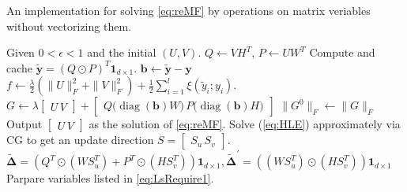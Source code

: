 \documentclass[11pt,twoside]{article}
\newcommand{\bsym}[1]{\ensuremath{\boldsymbol{#1}}}
\newcommand{\bb}{\ensuremath{\bsym{b}}}
\newcommand{\by}{\ensuremath{\bsym{y}}}
\newcommand{\byy}{\ensuremath{\bsym{\tilde{y}}}}
\newcommand{\pointprod}[2]{\ensuremath{\left( #1 \operatorname{\prescript{}{\cdot}{\ast}} #2 \right)}}
\DeclareMathOperator*{\diag}{diag}
\begin{document}
\clearpage\newpage
\begin{algorithm}
    \caption{An implementation for solving \eqref{eq:reMF} by operations on matrix veriables without vectorizing them.}
    \label{alg:LrFramework}
    \begin{algorithmic}[1]
        \State Given $0< \epsilon < 1$ and the initial $(U,V)$.
        \State $Q \gets VH^T$, $P \gets UW^T$
        \State Compute and cache $\bsym{\tilde{y}}= (Q \odot P)^T\bsym{1}_{d\times 1}$.
        \State $\bb \leftarrow \byy - \by $
        \State $f \gets \frac{\lambda}{2}(\|U\|_F^2 + \|V\|_F^2) + \frac{1}{2}\sum_{i=1}^l \xi(\tilde{y}_i;y_i)$.
            \State $G \gets \lambda \begin{bmatrix} U \, V \end{bmatrix} + \begin{bmatrix} Q \bigl(\diag(\bsym{b}) W \bigr) \, P \bigl ( \diag(\bsym{b}) H \bigr) \end{bmatrix}$
                \State $\|G^0\|_F \gets \|G\|_F$
            \EndIf
                \State Output $\begin{bmatrix} U \, V \end{bmatrix}$ as the solution of \eqref{eq:reMF}.
            \EndIf
            \State Solve (\ref{eq:HLE}) approximately via CG to get an update direction $S =  \begin{bmatrix} S_u \, S_v \end{bmatrix}$.
            \State $\bsym{\tilde{\Delta}} = \left( Q^T \odot (WS_u^T)+ P^T\odot (HS_v^T) \right)\bsym{1}_{d\times 1}, \bsym{\tilde{\Delta}}^\prime = \left( (WS_u^T) \odot (HS_v^T) \right)\bsym{1}_{d\times 1}$
            \State Parpare variables listed in \eqref{eq:LsRequire1}.

\end{algorithmic}
\end{algorithm}
\end{document}
